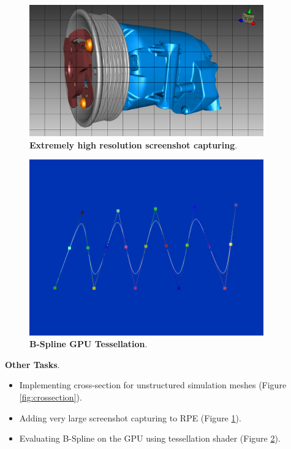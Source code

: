 \documentclass[]{report}
\begin{document}
\begin{figure}[!ht]
	\centering
	\includegraphics[width=0.90\textwidth]{./figs/highresscreenshot.png}
	\caption[Extremely high resolution screenshot capturing]{\textbf{Extremely high resolution screenshot capturing}.}
	\label{fig:highres}
\end{figure}

\begin{figure}[!ht]
	\centering
	\includegraphics[width=0.90\textwidth]{./figs/bspline.png}
	\caption[Extremely high resolution screenshot capturing]{\textbf{B-Spline GPU Tessellation}.}
	\label{fig:bspline}
\end{figure}

\textbf{Other Tasks}.
\begin{itemize}
	\item Implementing cross-section for unstructured simulation meshes (Figure \ref{fig:crossection}).
	\item Adding very large screenshot capturing to RPE (Figure \ref{fig:highres}).
	\item Evaluating B-Spline on the GPU using tessellation shader (Figure \ref{fig:bspline}).
\end{itemize}
 
\end{document}
